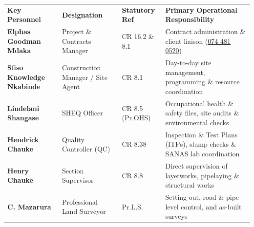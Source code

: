 \documentclass[a4paper,11pt]{article}
\begin{document}
\noindent
\renewcommand{\arraystretch}{1.16}
\begin{tabularx}{\textwidth}{@{}p{3.8cm} p{3.5cm} p{2.2cm} X@{}}
\rowcolor{mhnavy}
{\color{white}\bfseries\fontsize{7.9pt}{9.6pt}\selectfont Key Personnel} &
{\color{white}\bfseries\fontsize{7.9pt}{9.6pt}\selectfont Designation} &
{\color{white}\bfseries\fontsize{7.9pt}{9.6pt}\selectfont Statutory Ref} &
{\color{white}\bfseries\fontsize{7.9pt}{9.6pt}\selectfont Primary Operational Responsibility} \\
\rowcolor{mhbluelight}
\fontsize{7.5pt}{9.3pt}\selectfont\bfseries Elphas Goodman Mdaka & \fontsize{7.5pt}{9.3pt}\selectfont Project \& Contracts Manager & \fontsize{7.5pt}{9.3pt}\selectfont CR 16.2 \& 8.1 & \fontsize{7.5pt}{9.3pt}\selectfont Contract administration \& client liaison (\href{tel:0744810520}{074 481 0520}) \\
\fontsize{7.5pt}{9.3pt}\selectfont\bfseries Sfiso Knowledge Nkabinde & \fontsize{7.5pt}{9.3pt}\selectfont Construction Manager / Site Agent & \fontsize{7.5pt}{9.3pt}\selectfont CR 8.1 & \fontsize{7.5pt}{9.3pt}\selectfont Day-to-day site management, programming \& resource coordination \\
\rowcolor{mhbluelight}
\fontsize{7.5pt}{9.3pt}\selectfont\bfseries Lindelani Shangase & \fontsize{7.5pt}{9.3pt}\selectfont SHEQ Officer & \fontsize{7.5pt}{9.3pt}\selectfont CR 8.5 (Pr.OHS) & \fontsize{7.5pt}{9.3pt}\selectfont Occupational health \& safety files, site audits \& environmental checks \\
\fontsize{7.5pt}{9.3pt}\selectfont\bfseries Hendrick Chauke & \fontsize{7.5pt}{9.3pt}\selectfont Quality Controller (QC) & \fontsize{7.5pt}{9.3pt}\selectfont CR 8.38 & \fontsize{7.5pt}{9.3pt}\selectfont Inspection \& Test Plans (ITPs), slump checks \& SANAS lab coordination \\
\rowcolor{mhbluelight}
\fontsize{7.5pt}{9.3pt}\selectfont\bfseries Henry Chauke & \fontsize{7.5pt}{9.3pt}\selectfont Section Supervisor & \fontsize{7.5pt}{9.3pt}\selectfont CR 8.8 & \fontsize{7.5pt}{9.3pt}\selectfont Direct supervision of layerworks, pipelaying \& structural works \\
\fontsize{7.5pt}{9.3pt}\selectfont\bfseries C. Mazarura & \fontsize{7.5pt}{9.3pt}\selectfont Professional Land Surveyor & \fontsize{7.5pt}{9.3pt}\selectfont Pr.L.S. & \fontsize{7.5pt}{9.3pt}\selectfont Setting out, road \& pipe level control, and as-built surveys \\
\end{tabularx}
\renewcommand{\arraystretch}{1}
\end{document}
